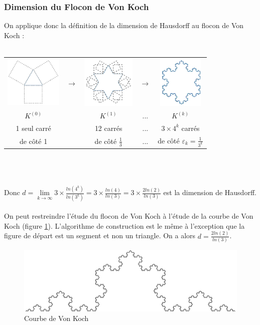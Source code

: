 \documentclass[a4paper,10pt]{report}
\begin{document}
\subsubsection{Dimension du Flocon de Von Koch}
On applique donc la définition de la dimension de Hausdorff au flocon de Von Koch :\\ \\
\begin{tabular}{ccccc}
\includegraphics[height=2.4cm]{koch_0.png} & $\rightarrow$ & \includegraphics[height=2.5cm]{koch_1.png} & $\rightarrow$ & \includegraphics[height=2.5cm]{koch_k.png}\\
$K^{(0)}$ & & $K^{(1)}$ & ... & $K^{(k)}$\\
1 seul carré & & 12 carrés & ... & $3\times 4^k$ carrés\\
de côté 1 & & de côté $\frac{1}{3}$ & ... & de côté $\varepsilon_k = \frac{1}{3^k}$\\
\end{tabular} \\ \\ \\
Donc $d=\lim\limits_{k \rightarrow \infty} 3\times \frac{ln(4^k)}{ln(3^k)}=3\times \frac{ln(4)}{ln(3)}=3\times \frac{2ln(2)}{ln(3)}$ est la dimension de Hausdorff.\\ \\
On peut restreindre l'étude du flocon de Von Koch à l'étude de la courbe de Von Koch (figure \ref{courbe_vonkoch}). L'algorithme de construction est le même à l'exception que la figure de départ est un segment et non un triangle. On a alors $d=\frac{2ln(2)}{ln(3)}$.
\begin{figure}[H]
\caption{Courbe de Von Koch}
\label{courbe_vonkoch}
\includegraphics[width=\textwidth]{koch_courbe.png}
\end{figure}
\end{document}

